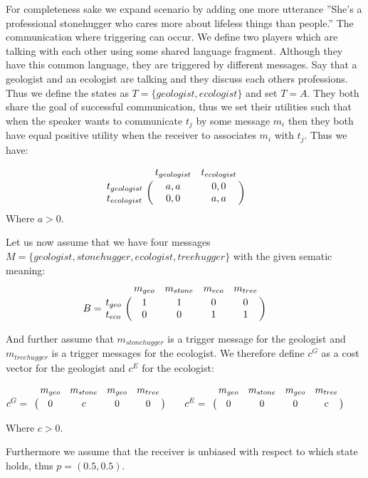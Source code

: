 \documentclass[10]{article}
\begin{document}
For completeness sake we expand scenario by adding one more utterance ''She's a professional stonehugger who cares more about lifeless things than people.''
The  communication where triggering can occur. We define two players which are talking with each other using some shared language fragment. Although they have this common language, they are triggered by different messages. Say that a geologist and an ecologist are talking and they discuss each others professions. Thus we define the states as $T=\{geologist, ecologist\}$ and set $T=A$. They both share the goal of successful communication, thus we set their utilities such that when the speaker wants to communicate $t_{j}$ by some message $m_i$ then they both have equal positive utility when the receiver to associates $m_i$ with $t_{j}$. Thus we have:

\begin{equation*}
\bordermatrix{
      & t_{geologist} & t_{ecologist}    \cr
  t_{geologist} & a,a & 0,0  \cr
  t_{ecologist} & 0,0 & a,a
}\qquad
\end{equation*}
Where $a>0$.

Let us now assume that we have four messages $M=\{geologist, stonehugger, ecologist, treehugger\}$ with the given sematic meaning:
 \begin{equation*}
 B =
 \bordermatrix{
            & m_{geo} & m_{stone} & m_{eco} & m_{tree}    \cr
   t_{geo}  &       1 &         1 & 0       & 0 \cr
   t_{eco}  &       0 &         0 & 1       & 1
 }\qquad
 \end{equation*}

 And further assume that $m_{stonehugger}$ is a trigger message for the geologist and $m_{treehugger}$ is a trigger messages for the ecologist. We therefore define $c^G$ as a cost vector for the geologist and $c^E$ for the ecologist:

  \begin{equation*}
  c^G =
  \bordermatrix{
             & m_{geo} & m_{stone} & m_{geo} & m_{tree}    \cr
             &       0 &         c & 0       & 0
  }\qquad
  c^E =
    \bordermatrix{
               & m_{geo} & m_{stone} & m_{geo} & m_{tree}    \cr
               &       0 &         0 & 0       & c
    }\qquad
  \end{equation*}

Where $c>0$.

Furthermore we assume that the receiver is unbiased with respect to which state holds, thus $p=(0.5,0.5)$.
\end{document}
